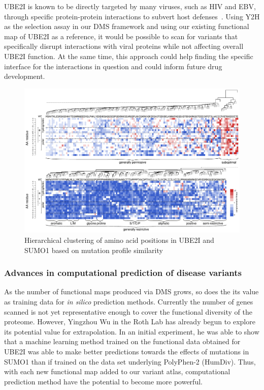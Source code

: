 UBE2I is known to be directly targeted by many viruses, such as HIV and EBV,  through specific protein-protein interactions to subvert host defenses~\cite{varadaraj_sumo_2014}. Using Y2H as the selection assay in our DMS framework and using our existing functional map of UBE2I as a reference, it would be possible to scan for variants that specifically disrupt interactions with viral proteins while not affecting overall UBE2I function. At the same time, this approach could help finding the specific interface for the interactions in question and could inform future drug development.

\begin{figure}[h!]
	\centering
	\includegraphics[width=\textwidth]{img/clustering.pdf}
	\caption{Hierarchical clustering of amino acid positions in UBE2I and SUMO1 based on mutation profile similarity}
	\label{fig:clustering}
\end{figure}

\subsubsection{Advances in computational prediction of disease variants}
As the number of functional maps produced via DMS grows, so does the its value as training data for \textit{in silico} prediction methods. Currently the number of genes scanned is not yet representative enough to cover the functional diversity of the proteome. However, Yingzhou Wu in the Roth Lab has already begun to explore its potential value for extrapolation. In an initial experiment, he was able to show that a machine learning method trained on the functional data obtained for UBE2I was able to make better predictions towards the effects of mutations in SUMO1 than if trained on the data set underlying PolyPhen-2 (HumDiv). Thus, with each new functional map added to our variant atlas, computational prediction method have the potential to become more powerful.

